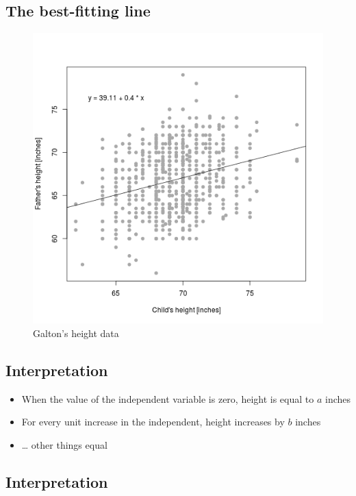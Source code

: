 \documentclass[12pt,twoside]{article}
\providecommand{\tightlist}{%
  \setlength{\itemsep}{0pt}\setlength{\parskip}{0pt}}
\begin{document}
\subsection{The best-fitting line}\label{the-best-fitting-line}

\begin{figure}[htbp]
\centering
\includegraphics{figure/galton-bestfit-1.png}
\caption{Galton's height data}
\end{figure}

\subsection{Interpretation}\label{interpretation}

\begin{itemize}
\tightlist
\item
  When the value of the independent variable is zero, height is equal to
  \(a\) inches
\item
  For every unit increase in the independent, height increases by \(b\)
  inches
\item
  \ldots{} other things equal
\end{itemize}

\subsection{Interpretation}\label{interpretation-1}
\end{document}
